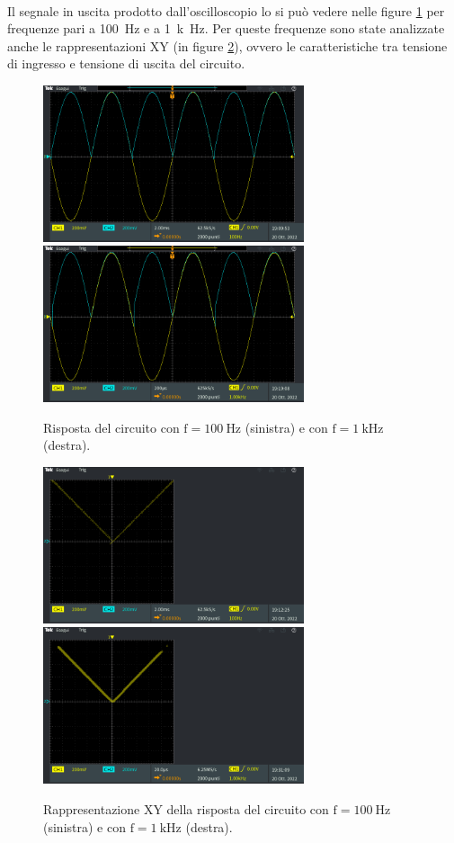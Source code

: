 \documentclass{report}
\begin{document}
\\Il segnale in uscita prodotto dall'oscilloscopio lo si può vedere nelle figure \ref{figura:uscita11} per frequenze pari a \SI{100}{\hertz} e a \SI{1}{k\hertz}. Per queste frequenze sono state analizzate anche le rappresentazioni XY (in figure \ref{figura:xyuscita1}), ovvero le caratteristiche tra tensione di ingresso e tensione di uscita del circuito.
\begin{figure}[h!]
	\centering
	\includegraphics[height=4.6cm]{immagini/TEK00000}
	\includegraphics[height=4.6cm]{immagini/TEK00003}
	\caption{Risposta del circuito con $\mathrm{f= \SI{100}{\hertz}}$ (sinistra) e con $\mathrm{f= \SI{1}{k\hertz}}$ (destra).}
	\label{figura:uscita11}
\end{figure}
\begin{figure}[h!]
	\centering
	\includegraphics[height=4.6cm]{immagini/TEK00001}
	\includegraphics[height=4.6cm]{immagini/TEK00010}
	\caption{Rappresentazione XY della risposta del circuito con $\mathrm{f= \SI{100}{\hertz}}$ (sinistra) e con $\mathrm{f= \SI{1}{k\hertz}}$ (destra).}
	\label{figura:xyuscita1}
\end{figure}
\end{document}
